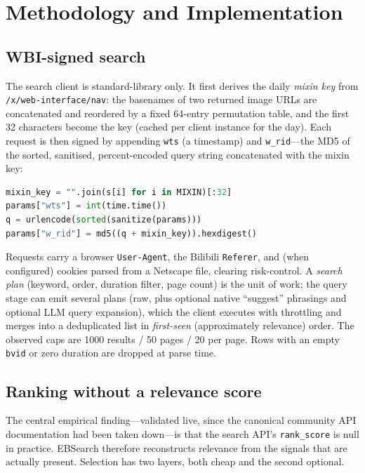 \documentclass[conference]{IEEEtran}
\begin{document}
\section{Methodology and Implementation}
\label{sec:method}

\subsection{WBI-signed search}
\label{sec:search}

The search client is standard-library only. It first derives the daily
\emph{mixin key} from \texttt{/x/web-interface/nav}: the basenames of two
returned image URLs are concatenated and reordered by a fixed 64-entry
permutation table, and the first 32 characters become the key (cached per client
instance for the day). Each request is then signed by appending \texttt{wts} (a
timestamp) and \texttt{w\_rid}---the MD5 of the sorted, sanitised,
percent-encoded query string concatenated with the mixin key:

\begin{lstlisting}[language=Python]
mixin_key = "".join(s[i] for i in MIXIN)[:32]
params["wts"] = int(time.time())
q = urlencode(sorted(sanitize(params)))
params["w_rid"] = md5((q + mixin_key)).hexdigest()
\end{lstlisting}

Requests carry a browser \texttt{User-Agent}, the Bilibili \texttt{Referer}, and
(when configured) cookies parsed from a Netscape file, clearing risk-control. A
\emph{search plan} (keyword, order, duration filter, page count) is the unit of
work; the query stage can emit several plans (raw, plus optional native
``suggest'' phrasings and optional LLM query expansion), which the client
executes with throttling and merges into a deduplicated list in
\emph{first-seen} (approximately relevance) order. The observed caps are 1000
results / 50 pages / 20 per page. Rows with an empty \texttt{bvid} or zero
duration are dropped at parse time.

\subsection{Ranking without a relevance score}
\label{sec:rank}

The central empirical finding---validated live, since the canonical community
API documentation had been taken down---is that the search API's
\texttt{rank\_score} is null in practice. EBSearch therefore reconstructs
relevance from the signals that are actually present. Selection has two layers,
both cheap and the second optional.
\end{document}
